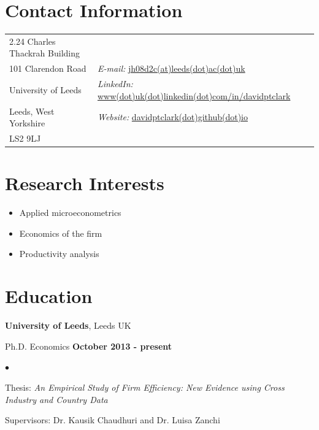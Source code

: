 \documentclass[margin,line,9pt]{res}
\newenvironment{list1}{
  \begin{list}{\ding{113}}{%
      \setlength{\itemsep}{0in}
      \setlength{\parsep}{0in} \setlength{\parskip}{0in}
      \setlength{\topsep}{0in} \setlength{\partopsep}{0in} 
      \setlength{\leftmargin}{0.17in}}}{\end{list}}
\newenvironment{list2}{
  \begin{list}{$\bullet$}{%
      \setlength{\itemsep}{0in}
      \setlength{\parsep}{0in} \setlength{\parskip}{0in}
      \setlength{\topsep}{0in} \setlength{\partopsep}{0in} 
      \setlength{\leftmargin}{0.2in}}}{\end{list}}
\begin{document}

\begin{resume}
\section{\sc Contact Information}
\vspace{.05in}
\begin{tabular}{@{}p{2in}p{4in}}
2.24 Charles Thackrah Building & \\
101 Clarendon Road  & {\it E-mail:}  \href{mailto:jh08d2c@leeds.ac.uk}{jh08d2c(at)leeds(dot)ac(dot)uk}\\ 
University of Leeds   & {\it LinkedIn:} \href{http://www.linkedin.com/in/davidptclark}{www(dot)uk(dot)linkedin(dot)com/in/davidptclark}\\           
Leeds, West Yorkshire & {\it Website:} \href{http://davidptclark.github.io}{davidptclark(dot)github(dot)io} \\       
LS2 9LJ  & \\ 
\end{tabular}


\section{\sc Research Interests}
\begin{itemize}
\item Applied microeconometrics
\item Economics of the firm
\item Productivity analysis	
\end{itemize}

\section{\sc Education}
{\bf University of Leeds}, Leeds UK\\
\vspace*{-.1in}
\begin{list1}
\item[] Ph.D. Economics  \hfill {\bf October 2013 - present}
\begin{list2}
\vspace*{.05in}
\item Thesis: \textit{An Empirical Study of Firm Efficiency: New Evidence using Cross Industry and Country Data}  
\item Supervisors:  Dr. Kausik Chaudhuri and Dr. Luisa Zanchi
\end{list2}
\end{list1}


\end{resume}
\end{document}
